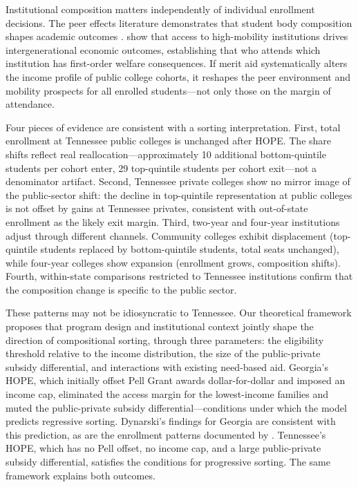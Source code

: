 Institutional composition matters independently of individual enrollment
decisions. The peer effects literature demonstrates that student body
composition shapes academic outcomes
\parencite{sacerdote2001peer}. \textcite{chetty2020mobility} show that
access to high-mobility institutions drives intergenerational economic
outcomes, establishing that who attends which institution has first-order
welfare consequences. If merit aid systematically alters the income
profile of public college cohorts, it reshapes the peer environment and
mobility prospects for all enrolled students---not only those on the
margin of attendance.

Four pieces of evidence are consistent with a sorting interpretation.
First, total enrollment at Tennessee public colleges is unchanged after
HOPE. The share shifts reflect real reallocation---approximately 10 additional
bottom-quintile students per cohort enter, 29 top-quintile students per
cohort exit---not a denominator artifact. Second, Tennessee private
colleges show no mirror image of the public-sector shift: the decline in
top-quintile representation at public colleges is not offset by gains at
Tennessee privates, consistent with out-of-state enrollment as the
likely exit margin. Third, two-year and four-year institutions adjust through
different channels. Community colleges exhibit displacement
(top-quintile students replaced by bottom-quintile students, total seats
unchanged), while four-year colleges show expansion (enrollment grows,
composition shifts). Fourth, within-state comparisons restricted to
Tennessee institutions confirm that the composition change is specific
to the public sector.

These patterns may not be idiosyncratic to Tennessee. Our theoretical
framework proposes that program design and institutional context jointly
shape the direction of compositional sorting, through three parameters:
the eligibility threshold relative to the income distribution, the size
of the public-private subsidy differential, and interactions with
existing need-based aid. Georgia's
HOPE, which initially offset Pell Grant awards dollar-for-dollar and
imposed an income cap, eliminated the access margin for the
lowest-income families and muted the public-private subsidy
differential---conditions under which the model predicts regressive
sorting. Dynarski's findings for Georgia are consistent with this
prediction, as are the enrollment patterns documented by
\textcite{cornwell2006enrollment}. Tennessee's HOPE, which has no Pell
offset, no income cap, and a large public-private subsidy
differential, satisfies the conditions for progressive sorting. The same
framework explains both outcomes.

